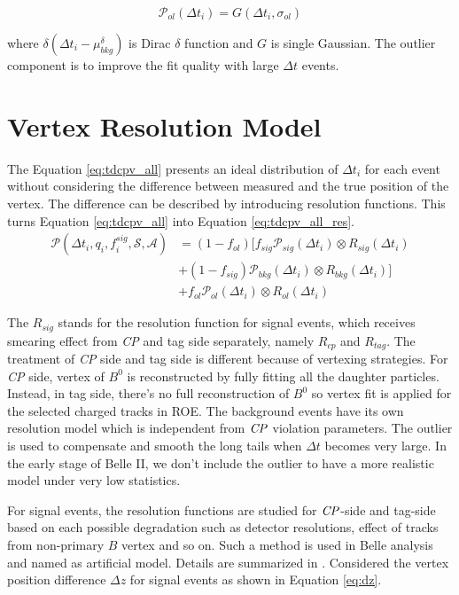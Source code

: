 \begin{equation}\label{eq:p_out}
\mathcal{P}_{ol} (\Delta t_i)=
G(\Delta t_i, \sigma_{ol})
\end{equation}

where $\delta(\Delta t_i-\mu_{bkg}^{\delta})$ is Dirac $\delta$ function and $G$ is single Gaussian. The outlier component is to improve the fit quality with large $\Delta t$ events.

\section{Vertex Resolution Model}

The Equation \ref{eq:tdcpv_all} presents an ideal distribution of $\Delta t_i$ for each event without considering the difference between measured and the true position of the vertex. The difference can be described by introducing resolution functions. This turns Equation \ref{eq:tdcpv_all} into Equation \ref{eq:tdcpv_all_res}.
\begin{equation}\label{eq:tdcpv_all_res}
\begin{split}
\mathcal{P}(\Delta t_i,q_i,f_i^{sig},\mathcal{S},\mathcal{A})
&=(1-f_{ol})\text{[}f_{sig}\mathcal{P}_{sig}(\Delta t_i)\otimes R_{sig}(\Delta t_i)\\
&+(1-f_{sig})\mathcal{P}_{bkg}(\Delta t_i)\otimes R_{bkg}(\Delta t_i)
\text{]}\\
&+f_{ol}\mathcal{P}_{ol}(\Delta t_i)\otimes R_{ol}(\Delta t_i)
\end{split}
\end{equation}

The $R_{sig}$ stands for the resolution function for signal events, which receives smearing effect from \textit{CP} and tag side separately, namely $R_{cp}$ and  $R_{tag}$. The treatment of \textit{CP} side and tag side is different because of vertexing strategies. For \textit{CP} side, vertex of $B^0$ is reconstructed by fully fitting all the daughter particles. Instead, in tag side, there's no full reconstruction of $B^0$ so vertex fit is applied for the selected charged tracks in ROE. The background events have its own resolution model which is independent from  $\it{CP}$ violation parameters. The outlier is used to compensate and smooth the long tails when $\Delta t$ becomes very large. In the early stage of Belle II, we don't include the outlier to have a more realistic model under very low statistics. 

For signal events, the resolution functions are studied for $\it{CP}$-side and tag-side based on each possible degradation such as detector resolutions, effect of tracks from non-primary $B$ vertex and so on. Such a method is used in Belle analysis and named as artificial model. Details are summarized in \cite{Yusa-note}. Considered the vertex position difference $\Delta z$ for signal events as shown in Equation \ref{eq:dz}. 

